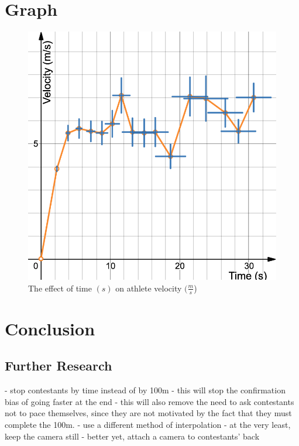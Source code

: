 \documentclass[index]{subfiles}
\begin{document}

\section{Graph}

\begin{figure}[H]
    \centering
    \caption{The effect of time \((s)\) on athlete velocity \((\frac{m}{s}\))}
    \includegraphics[scale=0.3]{pics/velocity-time.png}
\end{figure}

\section{Conclusion}
\subsection{Further Research}
- stop contestants by time instead of by 100m
- this will stop the confirmation bias of going faster at the end
- this will also remove the need to ask contestants not to pace themselves, since they are not motivated by the fact that they must complete the 100m.
- use a different method of interpolation
- at the very least, keep the camera still
- better yet, attach a camera to contestants' back
\end{document}
